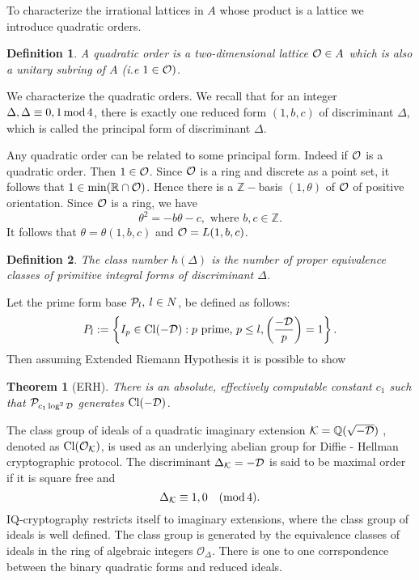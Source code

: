 \documentclass[12pt, letterpaper]{report}
\newtheorem{definition}{Definition}
\newtheorem{theorem}{Theorem}
\begin{document}
To characterize the irrational lattices in $A$ whose product is a lattice we introduce quadratic orders.
\begin{definition}
A quadratic order is a two-dimensional lattice ${\cal O} \in A$ which is also a unitary subring of $A$ (i.e $1 \in {\cal O})$.
\end{definition}
We characterize the quadratic orders. We recall that for an integer $\Delta, 
\Delta  \equiv 0, 1 \mathop{\rm mod} 4$, there is exactly one reduced form $(1, b, c)$ of discriminant $\Delta$,
which is called the principal form of discriminant $\Delta$.

Any quadratic order can be related to some principal form. Indeed if ${\cal O}$ is a quadratic order. Then $1 \in {\cal O}$.
Since  ${\cal O}$ is a ring and discrete as a point set, it follows that $1 \in {\rm min}(\mathbb{R}\cap {\cal O})$. Hence
there is a $\mathbb{Z}-$basis $(1, \theta)$ of ${\cal O}$ of positive orientation. Since ${\cal O}$ is a ring, we have 
$$
\theta^2 = -b\theta - c, \mbox{ where } b,c \in \mathbb{Z}.
$$
It follows that $\theta =\theta(1,b,c)$ and ${\cal O} = L(1,b,c)$.
\begin{definition}
The class number $h(\Delta)$ is the number of proper equivalence classes of primitive integral forms of discriminant $\Delta$.
\end{definition}

Let the prime form base ${\cal P}_{l},\: l \in N$, be defined as follows:
$$
P_{l}:= \left\{ I_{p}\in {\rm Cl}({-\cal D}): p \mbox{ prime, } p \le l, \left(\frac{-\cal D}{p}\right) = 1 \right\}.
$$
Then assuming Extended Riemann Hypothesis it is possible to show
\begin{theorem}[ERH]
There is an absolute, effectively computable constant $c_{1}$ such that ${\cal P}_{c_{1}\log^2{\cal D}}$ generates ${\rm Cl}(-\cal D)$.
\label{ERH}
\end{theorem}
\noindent
The class group of ideals of a quadratic imaginary extension $\cal{K} = \mathbb{Q}(\sqrt{-D})$ , denoted as ${\rm Cl}({\cal O}_{\cal K})$, is used as an underlying abelian group for Diffie - Hellman
cryptographic protocol. The discriminant $\Delta_{\cal{K}} = -{\cal D}$ is said to be maximal order if it is square free and 
$$\Delta_{\cal K}\equiv 1, 0 \quad (\mathop{\mathrm{mod}}4).$$ IQ-cryptography restricts itself to imaginary extensions, where the class group of ideals is well defined.
The  class group is generated by the equivalence classes of ideals in the ring of algebraic integers $\mathcal{O}_{\Delta}$. There is one to one 
corrspondence between the binary quadratic forms and reduced ideals. 
\end{document}
